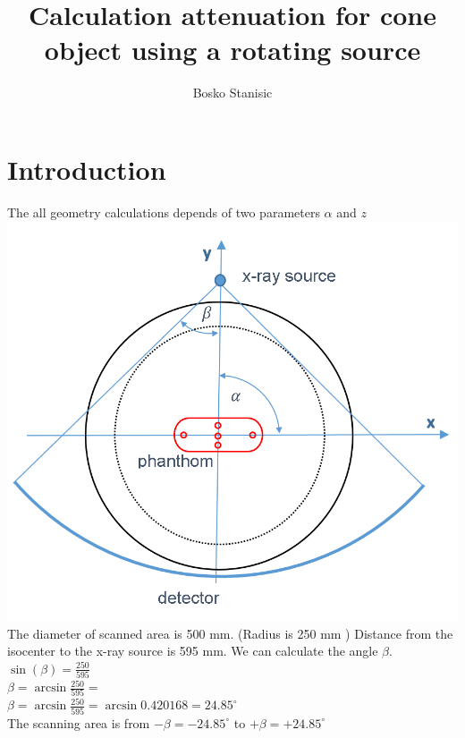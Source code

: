 \documentclass[12pt]{article}
\title{Calculation attenuation for cone object using a rotating source}
\author{Bosko Stanisic}
\begin{document}
\maketitle
\section{Introduction}

The all geometry calculations depends of two parameters  $\alpha$ and $z$ \\

\includegraphics[scale=0.5]{pic01.png} \\

The diameter of scanned area is 500 mm. (Radius is 250 mm ) Distance from the isocenter to the x-ray source is 595 mm. We can calculate the angle $\beta$.\\
$\sin(\beta)=\frac{250}{595}$\\
$\beta=\arcsin{\frac{250}{595}}=$\\
$\beta=\arcsin{\frac{250}{595}}=\arcsin{0.420168}=24.85^{\circ}$\\
The scanning area is from $-\beta=-24.85^{\circ}$ to $+\beta=+24.85^{\circ}$  \\
\end{document}
